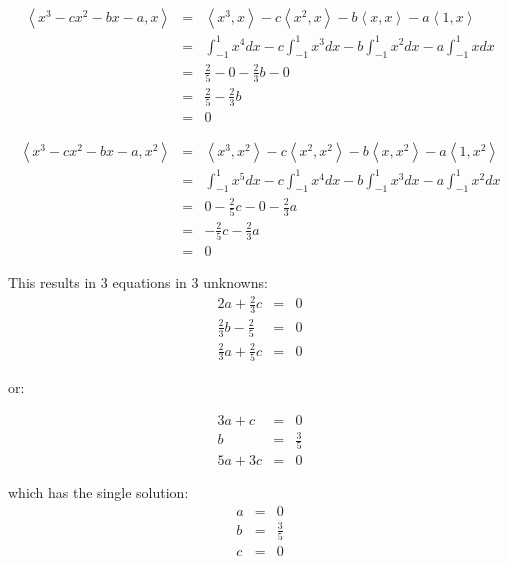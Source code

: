 \documentclass[letterpaper,12pt,fleqn]{article}
\newcommand{\inner}[2]{\left<#1,#2\right>}
\begin{document}
\begin{eqnarray*}
  \inner{x^3-cx^2-bx-a}{x} &=& \inner{x^3}{x}-c\inner{x^2}{x}-b\inner{x}{x}-
  a\inner{1}{x} \\
  &=& \int_{-1}^1x^4dx-c\int_{-1}^1x^3dx-b\int_{-1}^1x^2dx-a\int_{-1}^1xdx \\
  &=& \frac{2}{5}-0-\frac{2}{3}b-0 \\
  &=& \frac{2}{5}-\frac{2}{3}b \\
  &=& 0
\end{eqnarray*}

\begin{eqnarray*}
  \inner{x^3-cx^2-bx-a}{x^2} &=& \inner{x^3}{x^2}-c\inner{x^2}{x^2}-
  b\inner{x}{x^2}-a\inner{1}{x^2} \\
  &=& \int_{-1}^1x^5dx-c\int_{-1}^1x^4dx-b\int_{-1}^1x^3dx-a\int_{-1}^1x^2dx \\
  &=& 0-\frac{2}{5}c-0-\frac{2}{3}a \\
  &=& -\frac{2}{5}c-\frac{2}{3}a \\
  &=& 0
\end{eqnarray*}

This results in $3$ equations in $3$ unknowns:
\begin{eqnarray*}
  2a+\frac{2}{3}c &=& 0 \\
  \frac{2}{3}b-\frac{2}{5} &=& 0 \\
  \frac{2}{3}a+\frac{2}{5}c &=& 0
\end{eqnarray*}

or:

\begin{eqnarray*}
  3a+c &=& 0 \\
  b &=& \frac{3}{5} \\
  5a+3c &=& 0
\end{eqnarray*}

which has the single solution:
\begin{eqnarray*}
  a &=& 0 \\
  b &=& \frac{3}{5} \\
  c &=& 0
\end{eqnarray*}
\end{document}
